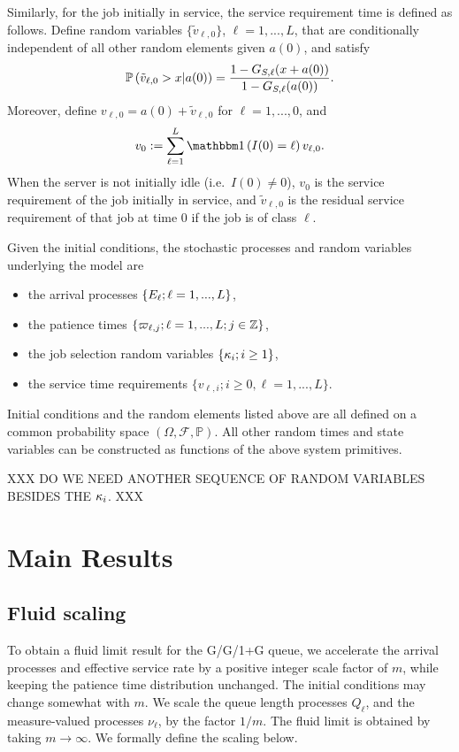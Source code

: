 \documentclass[stsy]{informs-stsy}
\begin{document}
Similarly, for the job initially in service, the  service requirement time is defined as follows. Define random variables $\{\tilde v_{\ell,0}\}$, $\ell=1,...,L$, that are conditionally independent of all other random elements given $a(0)$, and satisfy
\[
\mathbb{P}\left(\tilde v_{\ell,0}>x|a(0)\right) = \frac{1- G_{S,\ell}(x+a(0))}{1- G_{S,\ell}(a(0))}.
\]
Moreover, define $v_{\ell,0}= a(0)+\tilde v_{\ell,0}$ for $\ell=1,...,0$, and
\begin{equation}\label{def_initial_service}
v_0 := \sum_{\ell=1}^L \indic{I(0)=\ell} v_{\ell,0}.
\end{equation}
When the server is not initially idle (i.e.\ $I(0)\neq 0$), $v_0$ is the  service requirement of the job initially in service, and $\tilde v_{\ell,0}$ is the residual service requirement of that job at time $0$ if the job is of class $\ell$.

\begin{remark}
Given the initial conditions, the stochastic processes and random variables underlying the model are
\begin{itemize}
\item the arrival processes $\{E_\ell;\ell=1,...,L\}$, 
\item the patience times $\{\varpi_{\ell,j};\ell=1,...,L;j\in\mathbb{Z}\}$,
\item the job selection random variables $\{\kappa_i;i\geq 1\}$, 
\item the service time requirements $\{v_{\ell,i};i\geq 0,\ell=1,...,L\}.$ 
\end{itemize}
Initial conditions and the random elements listed above are all defined on a common probability space $(\Omega,\mathcal{F},\mathbb{P})$. All other random times and state variables can be constructed as functions of the above system primitives.
\end{remark}


XXX DO WE NEED ANOTHER SEQUENCE OF RANDOM VARIABLES BESIDES THE $\kappa_i$. XXX




\section{Main Results}

\subsection{Fluid scaling}\label{sec_seq}

To obtain a fluid limit result for the G/G/1+G queue, we  accelerate the arrival processes and effective service rate by a positive integer scale factor of $m$, while keeping the patience time distribution unchanged. The initial conditions may change somewhat with $m$.  We  scale the queue length processes $Q_\ell$, and the measure-valued processes $\nu_\ell$, by the factor $1/m$. 
The fluid limit is obtained by taking $m\to\infty$. We formally define the scaling below. 
\end{document}
